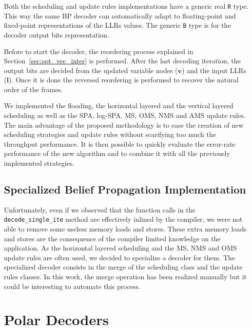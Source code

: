 Both the scheduling and update rules implementations have a generic real
\verb|R| type. This way the same BP decoder can automatically adapt to
floating-point and fixed-point representations of the LLRs values. The generic
\verb|B| type is for the decoder output bits representation.

Before to start the decoder, the reordering process explained in
Section~\ref{sec:opt_vec_inter} is performed. After the last decoding
iteration, the output bits are decided from the updated variable nodes
($\bm{v}$) and the input LLRs ($\bm{l}$). Once it is done the reversed
reordering is performed to recover the natural order of the frames.

We implemented the flooding, the horizontal layered and the vertical layered
scheduling as well as the SPA, log-SPA, MS, OMS, NMS and AMS update rules.
The main advantage of the proposed methodology is to ease the creation of new
scheduling strategies and update rules without scarifying too much the
throughput performance. It is then possible to quickly evaluate the error-rate
performance of the new algorithm and to combine it with all the previously
implemented strategies.

\subsection{Specialized Belief Propagation Implementation}
\label{sec:opt_ldpc_spe_bphlnms}

Unfortunately, even if we observed that the function calls in the
\verb|decode_single_ite| method are effectively inlined by the compiler, we were
not able to remove some useless memory loads and stores. These extra memory
loads and stores are the consequence of the compiler limited knowledge on the
application. As the horizontal layered scheduling and the MS, NMS and OMS update
rules are often used, we decided to specialize a decoder for them. The
specialized decoder consists in the merge of the scheduling class and the update
rules classes. In this work, the merge operation has been realized manually but
it could be interesting to automate this process.

\section{Polar Decoders}
\label{sec:opt_polar}


